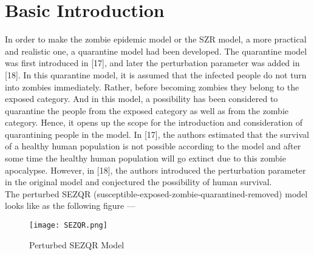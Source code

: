 \section{Basic Introduction}

In order to make the zombie epidemic model or the SZR model, a more practical and realistic one, a quarantine model had been developed. The quarantine model was first introduced in [17], and later the perturbation parameter was added in [18]. In this quarantine model, it is assumed that the infected people do not turn into zombies immediately. Rather, before becoming zombies they belong to the exposed category. And in this model, a possibility has been considered to quarantine the people from the exposed category as well as from the zombie category. Hence, it opens up the scope for the introduction and consideration of quarantining people in the model. In [17], the authors estimated that the survival of a healthy human population is not possible according to the model and after some time the healthy human population will go extinct due to this zombie apocalypse. However, in [18], the authors introduced the perturbation parameter in the original model and conjectured the possibility of human survival.  \\


The perturbed SEZQR (susceptible-exposed-zombie-quarantined-removed) model looks like as the following figure ---

\begin{figure}[h]
\centering
\texttt{[image: SEZQR.png]}
\caption{Perturbed SEZQR Model}
\label{fig:Perturbed SEZQR Model}
\end{figure}

